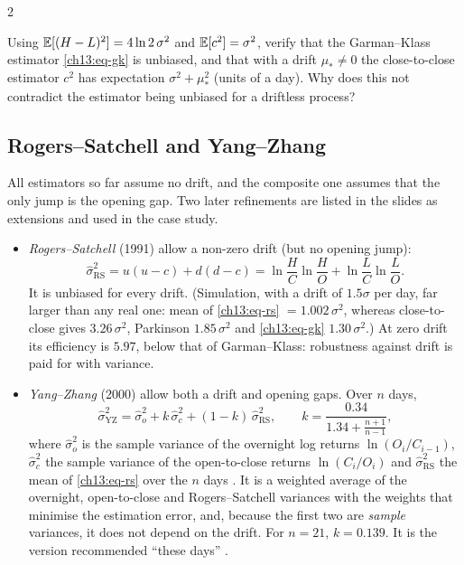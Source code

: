 \begin{paracol}{2}
\begin{exercise}\label{ch13:ex-extra2}
Using $\mathbb{E}[(H-L)^2]=4\ln2\,\sigma^2$ and $\mathbb{E}[c^2]=\sigma^2$, verify that the Garman--Klass estimator \eqref{ch13:eq-gk} is unbiased, and that with a drift $\mu_*\ne0$ the close-to-close estimator $c^2$ has expectation $\sigma^2+\mu_*^2$ (units of a day). Why does this not contradict the estimator being unbiased for a driftless process?
\end{exercise}

\subsection{Rogers--Satchell and Yang--Zhang}\label{ch13:sec-rsyz}
\begin{secondary}
All estimators so far assume no drift, and the composite one assumes that the only jump is the opening gap. Two later refinements are
listed in the slides as extensions and used in the case study.
\begin{itemize}
  \item \emph{Rogers--Satchell} (1991) allow a non-zero drift (but no opening jump):
        \begin{equation}\label{ch13:eq-rs}
          \hat\sigma^2_{\mathrm{RS}}=u(u-c)+d(d-c)=\ln\frac HC\ln\frac HO+\ln\frac LC\ln\frac LO .
        \end{equation}
        It is unbiased for every drift. (Simulation, with a drift of $1.5\sigma$ per day, far larger than any real one: mean of
        \eqref{ch13:eq-rs} $=1.002\,\sigma^2$, whereas close-to-close gives $3.26\,\sigma^2$, Parkinson $1.85\,\sigma^2$ and \eqref{ch13:eq-gk} $1.30\,\sigma^2$.) At zero drift its
        efficiency is $5.97$, below that of Garman--Klass: robustness against drift is paid for with variance.
  \item \emph{Yang--Zhang} (2000) allow both a drift and opening gaps. Over $n$ days,
        \begin{equation}\label{ch13:eq-yz}
          \hat\sigma^2_{\mathrm{YZ}}=\hat\sigma^2_{o}+k\,\hat\sigma^2_{c}+(1-k)\,\hat\sigma^2_{\mathrm{RS}},\qquad
          k=\frac{0.34}{1.34+\frac{n+1}{n-1}},
        \end{equation}
        where $\hat\sigma^2_o$ is the sample variance of the overnight log returns $\ln(O_i/C_{i-1})$, $\hat\sigma_c^2$ the sample variance of the
        open-to-close returns $\ln(C_i/O_i)$ and $\hat\sigma^2_{\mathrm{RS}}$ the mean of \eqref{ch13:eq-rs} over the $n$ days
        . It is a weighted average of the overnight, open-to-close and Rogers--Satchell variances with the weights that minimise the estimation error,
        and, because the first two are \emph{sample} variances, it does not depend on the drift. For $n=21$, $k=0.139$. It is the
        version recommended ``these days'' .
\end{itemize}
\end{secondary}


\end{paracol}
